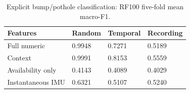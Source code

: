 \begin{table}[p]
\centering
\begin{singlespace}
\small
\caption{Explicit bump/pothole classification: RF100 five-fold mean macro-F1.}\label{tab:binary}
\begin{tabularx}{\linewidth}{XYYY}
\toprule
Features & Random & Temporal & Recording \\
\midrule
Full numeric & 0.9948 & 0.7271 & 0.5189 \\
Context & 0.9991 & 0.8153 & 0.5559 \\
Availability only & 0.4143 & 0.4089 & 0.4029 \\
Instantaneous IMU & 0.6321 & 0.5107 & 0.5240 \\
\bottomrule
\end{tabularx}
\end{singlespace}
\end{table}
